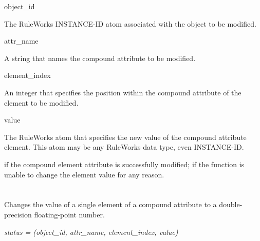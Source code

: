 \begin{arguments}
\item[object\_id]

  The RuleWorks INSTANCE-ID atom associated with the object to be
  modified.

\item[attr\_name]

  A string that names the compound attribute to be modified.

\item[element\_index]

  An integer that specifies the position within the compound attribute
  of the element to be modified.

\item[value]

  The RuleWorks atom that specifies the new value of the compound
  attribute element. This atom may be any RuleWorks data type, even
  INSTANCE-ID.
\end{arguments}

\ReturnValue

 if the compound element attribute is successfully modified;
 if the function is unable to change the element value for
any reason.

\begin{seealso}





\end{seealso}

\section*{}

Changes the value of a single element of a compound attribute to a
double-precision floating-point number.

\Syntax

\it{status} = (\it{object\_id},
\it{attr\_name}, \it{element\_index}, \it{value})

\begin{args}
   \\
   \\
   \\
   \\
\end{args}

